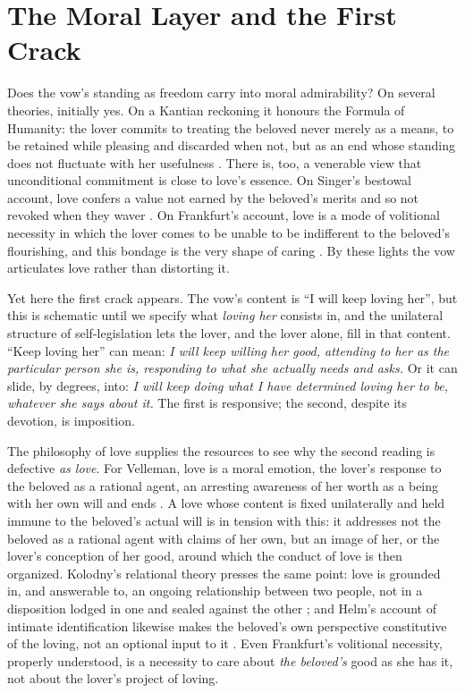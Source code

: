 \documentclass[11pt,a4paper]{article}
\begin{document}
\section{The Moral Layer and the First Crack}\label{p03:sec:moral}

Does the vow's standing as freedom carry into moral admirability? On several theories, initially yes. On a Kantian reckoning it honours the Formula of Humanity: the lover commits to treating the beloved never merely as a means, to be retained while pleasing and discarded when not, but as an end whose standing does not fluctuate with her usefulness \parencite[4:429]{kant1785groundwork}. There is, too, a venerable view that unconditional commitment is close to love's essence. On Singer's bestowal account, love confers a value not earned by the beloved's merits and so not revoked when they waver \parencite{singer1991nature}. On Frankfurt's account, love is a mode of volitional necessity in which the lover comes to be unable to be indifferent to the beloved's flourishing, and this bondage is the very shape of caring \parencite{frankfurt2004reasons}. By these lights the vow articulates love rather than distorting it.

Yet here the first crack appears. The vow's content is ``I will keep loving her'', but this is schematic until we specify what \emph{loving her} consists in, and the unilateral structure of self-legislation lets the lover, and the lover alone, fill in that content. ``Keep loving her'' can mean: \emph{I will keep willing her good, attending to her as the particular person she is, responding to what she actually needs and asks.} Or it can slide, by degrees, into: \emph{I will keep doing what I have determined loving her to be, whatever she says about it.} The first is responsive; the second, despite its devotion, is imposition.

The philosophy of love supplies the resources to see why the second reading is defective \emph{as love}. For Velleman, love is a moral emotion, the lover's response to the beloved as a rational agent, an arresting awareness of her worth as a being with her own will and ends \parencite{velleman1999love}. A love whose content is fixed unilaterally and held immune to the beloved's actual will is in tension with this: it addresses not the beloved as a rational agent with claims of her own, but an image of her, or the lover's conception of her good, around which the conduct of love is then organized. Kolodny's relational theory presses the same point: love is grounded in, and answerable to, an ongoing relationship between two people, not in a disposition lodged in one and sealed against the other \parencite{kolodny2003love}; and Helm's account of intimate identification likewise makes the beloved's own perspective constitutive of the loving, not an optional input to it \parencite{helm2010love}. Even Frankfurt's volitional necessity, properly understood, is a necessity to care about \emph{the beloved's} good as she has it, not about the lover's project of loving.
\end{document}
